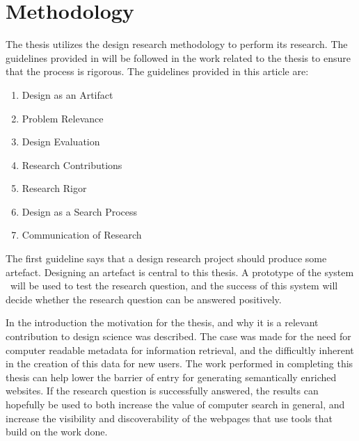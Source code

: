 
\chapter{Methodology} %

\label{Methodology} %


The thesis utilizes the design research methodology to perform its research.
The guidelines provided in \citet{Hevner2004} will be followed in the work related to the thesis to ensure that the process is rigorous.
The guidelines provided in this article are:
\begin{enumerate}
	\item \label{gl1}Design as an Artifact
	\item \label{gl2}Problem Relevance
	\item \label{gl3}Design Evaluation
	\item \label{gl4}Research Contributions
	\item \label{gl5}Research Rigor
	\item \label{gl6}Design as a Search Process
	\item \label{gl7}Communication of Research
\end{enumerate}

The first guideline says that a design research project should produce some artefact.
Designing an artefact is central to this thesis.
A prototype of the system \theartefact\ will be used to test the research question,
and the success of this system will decide whether the research question can be answered positively.

In the introduction the motivation for the thesis, and why it is a relevant contribution to design science was described.
The case was made for the need for computer readable metadata for information retrieval,
and the difficultly inherent in the creation of this data for new users.
The work performed in completing this thesis can help lower the barrier of entry for generating semantically enriched websites.
If the research question is successfully answered, the results can hopefully be used to both increase the value of computer search in general,
and increase the visibility and discoverability of the webpages that use tools that build on the work done.


